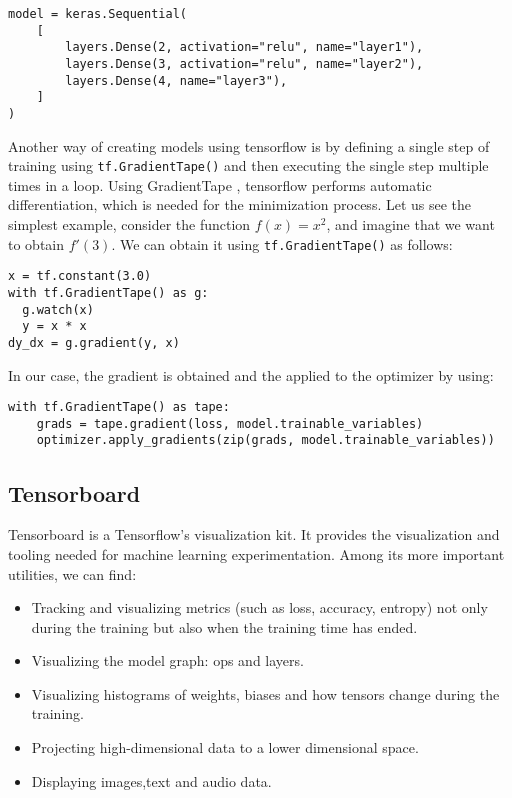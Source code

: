 \begin{verbatim}
model = keras.Sequential(
    [
        layers.Dense(2, activation="relu", name="layer1"),
        layers.Dense(3, activation="relu", name="layer2"),
        layers.Dense(4, name="layer3"),
    ]
)
\end{verbatim}

Another way of creating models using tensorflow is by defining a single step of training using \lstinline{tf.GradientTape()} and then executing the single step multiple times in a loop. Using GradientTape , tensorflow performs automatic differentiation, which is needed for the minimization process. Let us see the simplest example, consider the function $f(x) = x^2$, and imagine that we want to obtain $f'(3)$. We can obtain it using \lstinline{tf.GradientTape()} as follows:

\begin{verbatim}
x = tf.constant(3.0)
with tf.GradientTape() as g:
  g.watch(x)
  y = x * x
dy_dx = g.gradient(y, x)
\end{verbatim}

In our case, the gradient is obtained and the applied to the optimizer by using:

\begin{verbatim}
with tf.GradientTape() as tape:
    grads = tape.gradient(loss, model.trainable_variables)
    optimizer.apply_gradients(zip(grads, model.trainable_variables))
\end{verbatim}


\subsection{Tensorboard}

Tensorboard is a Tensorflow's visualization kit. It provides the visualization and tooling needed for machine learning experimentation. Among its more important utilities, we can find:
\begin{itemize}
\item Tracking and visualizing metrics (such as loss, accuracy, entropy) not only during the training but also when the training time has ended.

\item Visualizing the model graph: ops and layers.

\item Visualizing histograms of weights, biases and how tensors change during the training.

\item Projecting high-dimensional data to a lower dimensional space.

\item Displaying images,text and audio data.
\end{itemize}

